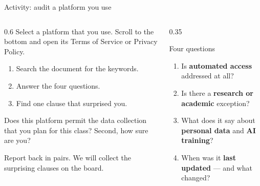 \documentclass[9pt,aspectratio=169]{beamer}
\begin{document}
\begin{frame}{Activity: audit a platform you use}
    \begin{columns}[T]
        \begin{column}{0.6\textwidth}
            Select a platform that you use. Scroll to the bottom and open its Terms of Service or Privacy Policy.

            \medskip

            \begin{enumerate}
                \item Search the document for the keywords.
                \item Answer the four questions.
                \item Find one clause that surprised you.
            \end{enumerate}

            \medskip

            Does this platform permit the data collection that you plan for this class? Second, how sure are you?

            \medskip
            Report back in pairs. We will collect the surprising clauses on the board.
        \end{column}
        \begin{column}{0.35\textwidth}
            \begin{block}{Four questions}
                \begin{enumerate}\small
                \item Is \textbf{automated access} addressed at all?
                \item Is there a \textbf{research or academic} exception?
                \item What does it say about \textbf{personal data} and \textbf{AI training}?
                \item When was it \textbf{last updated} --- and what changed?
            \end{enumerate}
            \end{block}
        \end{column}
    \end{columns}
\end{frame}
\end{document}
